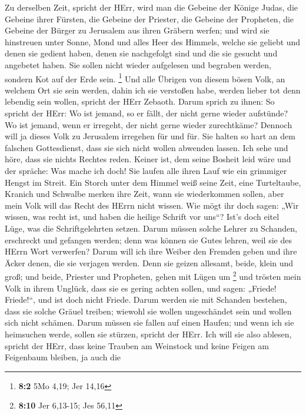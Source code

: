  Zu derselben Zeit, spricht der HErr, wird man die Gebeine
der Könige Judas, die Gebeine ihrer Fürsten, die Gebeine der Priester,
die Gebeine der Propheten, die Gebeine der Bürger zu Jerusalem aus ihren
Gräbern werfen;  und wird sie hinstreuen unter Sonne, Mond
und alles Heer des Himmels, welche sie geliebt und denen sie gedient
haben, denen sie nachgefolgt sind und die sie gesucht und angebetet
haben. Sie sollen nicht wieder aufgelesen und begraben werden, sondern
Kot auf der Erde sein. \footnote{\textbf{8:2} 5Mo 4,19; Jer 14,16}
 Und alle Übrigen von diesem bösen Volk, an welchem Ort sie
sein werden, dahin ich sie verstoßen habe, werden lieber tot denn
lebendig sein wollen, spricht der HErr Zebaoth.  Darum
sprich zu ihnen: So spricht der HErr: Wo ist jemand, so er fällt, der
nicht gerne wieder aufstünde? Wo ist jemand, wenn er irregeht, der nicht
gerne wieder zurechtkäme?  Dennoch will ja dieses Volk zu
Jerusalem irregehen für und für. Sie halten so hart an dem falschen
Gottesdienst, dass sie sich nicht wollen abwenden lassen. 
Ich sehe und höre, dass sie nichts Rechtes reden. Keiner ist, dem seine
Bosheit leid wäre und der spräche: Was mache ich doch! Sie laufen alle
ihren Lauf wie ein grimmiger Hengst im Streit.  Ein Storch
unter dem Himmel weiß seine Zeit, eine Turteltaube, Kranich und Schwalbe
merken ihre Zeit, wann sie wiederkommen sollen, aber mein Volk will das
Recht des HErrn nicht wissen.  Wie mögt ihr doch sagen: „Wir
wissen, was recht ist, und haben die heilige Schrift vor uns``? Ist's
doch eitel Lüge, was die Schriftgelehrten setzen.  Darum
müssen solche Lehrer zu Schanden, erschreckt und gefangen werden; denn
was können sie Gutes lehren, weil sie des HErrn Wort verwerfen?
 Darum will ich ihre Weiber den Fremden geben und ihre
Äcker denen, die sie verjagen werden. Denn sie geizen allesamt, beide,
klein und groß; und beide, Priester und Propheten, gehen mit Lügen um
\footnote{\textbf{8:10} Jer 6,13-15; Jes 56,11}  und
trösten mein Volk in ihrem Unglück, dass sie es gering achten sollen,
und sagen: „Friede! Friede!{}``, und ist doch nicht Friede.
 Darum werden sie mit Schanden bestehen, dass sie solche
Gräuel treiben; wiewohl sie wollen ungeschändet sein und wollen sich
nicht schämen. Darum müssen sie fallen auf einen Haufen; und wenn ich
sie heimsuchen werde, sollen sie stürzen, spricht der HErr.
 Ich will sie also ablesen, spricht der HErr, dass keine
Trauben am Weinstock und keine Feigen am Feigenbaum bleiben, ja auch die
